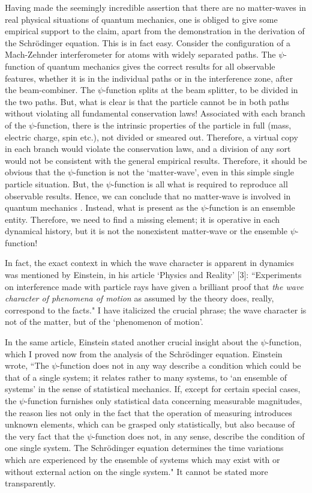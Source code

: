 Having made the seemingly incredible assertion that there are no matter-waves in real
physical situations of quantum mechanics, one is obliged to give some empirical support to
the claim, apart from the demonstration in the derivation of the Schrödinger equation. This
is in fact easy. Consider the configuration of a Mach-Zehnder interferometer for atoms with
widely separated paths. The $\psi$-function of quantum mechanics gives the correct results for
all observable features, whether it is in the individual paths or in the interference zone, after
the beam-combiner. The $\psi$-function splits at the beam splitter, to be divided in the two
paths. But, what is clear is that the particle cannot be in both paths without violating
all fundamental conservation laws! Associated with each branch of the $\psi$-function, there is
the intrinsic properties of the particle in full (mass, electric charge, spin etc.), not divided
or smeared out. Therefore, a virtual copy in each branch would violate the conservation
laws, and a division of any sort would not be consistent with the general empirical results.
Therefore, it should be obvious that the $\psi$-function is not the `matter-wave', even in this
simple single particle situation. But, the $\psi$-function is all what is required to reproduce
all observable results. Hence, we can conclude that no matter-wave is involved in quantum
mechanics \cite{chap27-key2}. Instead, what is present as the $\psi$-function is an ensemble entity. Therefore,
we need to find a missing element; it is operative in each dynamical history, but it is not
the nonexistent matter-wave or the ensemble $\psi$-function!

In fact, the exact context in which the wave character is apparent in dynamics was
mentioned by Einstein, in his article `Physics and Reality' [3]: ``Experiments on interference
made with particle rays have given a brilliant proof that \textit{the wave character of phenomena of
motion} as assumed by the theory does, really, correspond to the facts." I have italicized the
crucial phrase; the wave character is not of the matter, but of the `phenomenon of motion'.

In the same article, Einstein stated another crucial insight about the $\psi$-function, which I
proved now from the analysis of the Schrödinger equation. Einstein wrote, “The $\psi$-function
does not in any way describe a condition which could be that of a single system; it relates
rather to many systems, to `an ensemble of systems' in the sense of statistical mechanics.
If, except for certain special cases, the $\psi$-function furnishes only statistical data concerning
measurable magnitudes, the reason lies not only in the fact that the operation of measuring
introduces unknown elements, which can be grasped only statistically, but also because of
the very fact that the $\psi$-function does not, in any sense, describe the condition of one single
system. The Schr\"{o}dinger equation determines the time variations which are experienced
by the ensemble of systems which may exist with or without external action on the single
system." It cannot be stated more transparently.

